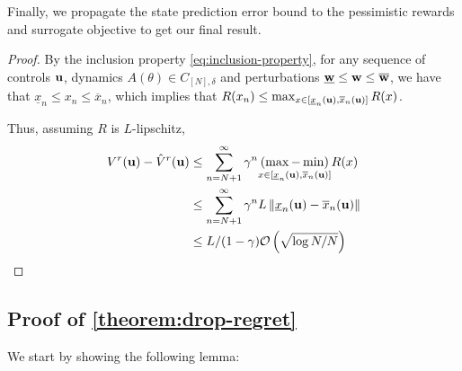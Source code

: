 \documentclass{article}
\begin{document}
Finally, we propagate the state prediction error bound to the pessimistic rewards and surrogate objective to get our final result.
\begin{proof}
 By the inclusion property \eqref{eq:inclusion-property}, for any sequence of controls $\mathbf{u}$, dynamics $A(\theta)\in C_{[N],\delta}$ and perturbations $\underline{\mathbf{w}} \leq \mathbf{w} \leq \overline{\mathbf{w}}$, we have that $\underline{x}_n \leq x_n \leq \overline{x}_n$, which implies that $R(x_n) \leq \max_{x\in[\underline{x}_n(\mathbf{u}), \overline{x}_n(\mathbf{u})]}  R(x)$.
 
 Thus, assuming $R$ is $L$-lipschitz,
 \begin{align}
     V^r(\mathbf{u}) - \hat{V}^r(\mathbf{u}) &\leq \sum_{n=N+1}^\infty \gamma^n \underset{{x\in[\underline{x}_n(\mathbf{u}), \overline{x}_n(\mathbf{u})]}}{(\max - \min)} R(x)\\
     &\leq \sum_{n=N+1}^\infty \gamma^n L \left\|\underline{x}_n(\mathbf{u}) - \overline{x}_n(\mathbf{u})\right\|\\
     &\leq L/(1-\gamma) \mathcal{O}\left(\sqrt{\log N / N}\right)
 \end{align}
\end{proof}


\subsection{Proof of \autoref{theorem:drop-regret}}

We start by showing the following lemma:
\end{document}
